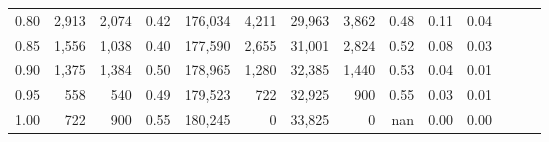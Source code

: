 \begin{tabular}{rrrrrrrrrrrrrr}
0.80 &   2,913 &  2,074 &  0.42 &  176,034 &    4,211 &  29,963 &   3,862 &  0.48 &  0.11 &      0.04 \\
0.85 &   1,556 &  1,038 &  0.40 &  177,590 &    2,655 &  31,001 &   2,824 &  0.52 &  0.08 &      0.03 \\
0.90 &   1,375 &  1,384 &  0.50 &  178,965 &    1,280 &  32,385 &   1,440 &  0.53 &  0.04 &      0.01 \\
0.95 &     558 &    540 &  0.49 &  179,523 &      722 &  32,925 &     900 &  0.55 &  0.03 &      0.01 \\
1.00 &     722 &    900 &  0.55 &  180,245 &        0 &  33,825 &       0 &   nan &  0.00 &      0.00 \\
\bottomrule
\end{tabular}
